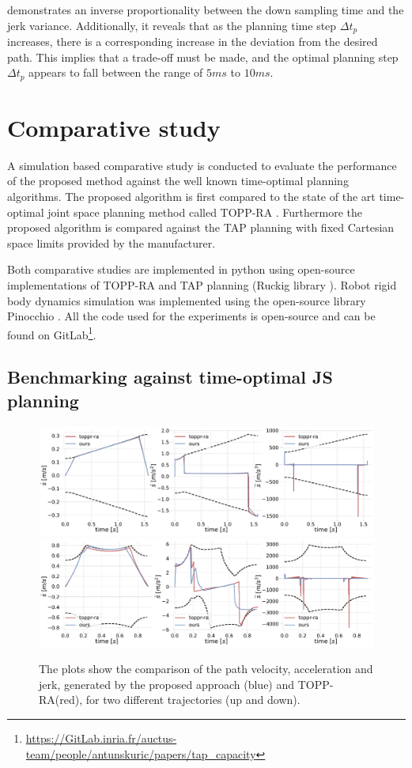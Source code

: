  demonstrates an inverse proportionality between the down sampling time and the jerk variance. Additionally, it reveals that as the planning time step $\Delta t_p$ increases, there is a corresponding increase in the deviation from the desired path. This implies that a trade-off must be made, and the optimal planning step $\Delta t_p$ appears to fall between the range of $5ms$ to $10ms$.

\section{Comparative study}
\label{ch:comp_study}
A simulation based comparative study is conducted to evaluate the performance of the proposed method against the well known time-optimal planning algorithms. The proposed algorithm is first compared to the state of the art time-optimal joint space planning method called TOPP-RA \cite{Pham2018}. Furthermore the proposed algorithm is compared against the TAP planning with fixed Cartesian space limits provided by the manufacturer.

Both comparative studies are implemented in python
using open-source implementations of TOPP-RA \cite{Pham2018} and TAP planning (Ruckig library \cite{ruckig}). 
Robot rigid body dynamics simulation was implemented using the open-source library Pinocchio \cite{pinocchio2021}. 
All the code used for the experiments is open-source and can be found on GitLab\footnote{\url{https://GitLab.inria.fr/auctus-team/people/antunskuric/papers/tap_capacity}}.

\subsection{Benchmarking against time-optimal JS planning}

\begin{figure}[!t]
    \centering
    \includegraphics[width=\linewidth]{Papers/imgs/ruckig_toppra_comp1679478306.pdf}
    \includegraphics[width=\linewidth]{Papers/imgs/ruckig_toppra_comp1681374566.pdf}
    \caption{The plots show the comparison of the path velocity, acceleration and jerk, generated by the proposed approach (blue) and TOPP-RA(red), for two different trajectories (up and down). }
    \label{fig:comparison_trajectory}
\end{figure}

